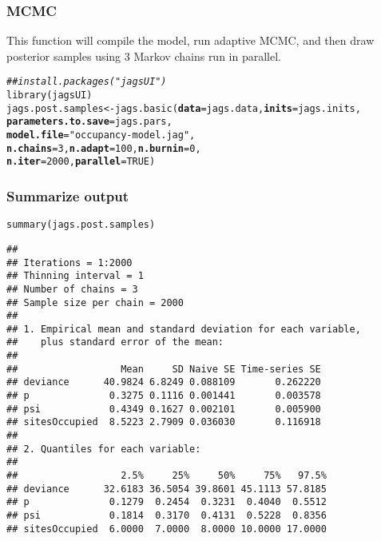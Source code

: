 \documentclass[color=usenames,dvipsnames]{beamer}\usepackage[]{graphicx}\usepackage[]{color}
\makeatletter
\newcommand{\hlnum}[1]{\textcolor[rgb]{0.69,0.494,0}{#1}}%
\newcommand{\hlstr}[1]{\textcolor[rgb]{0.749,0.012,0.012}{#1}}%
\newcommand{\hlcom}[1]{\textcolor[rgb]{0.514,0.506,0.514}{\textit{#1}}}%
\newcommand{\hlstd}[1]{\textcolor[rgb]{0,0,0}{#1}}%
\newcommand{\hlkwb}[1]{\textcolor[rgb]{0,0.341,0.682}{#1}}%
\newcommand{\hlkwc}[1]{\textcolor[rgb]{0,0,0}{\textbf{#1}}}%
\newcommand{\hlkwd}[1]{\textcolor[rgb]{0.004,0.004,0.506}{#1}}%
\newenvironment{kframe}{%
 \def\at@end@of@kframe{}%
 \ifinner\ifhmode%
  \def\at@end@of@kframe{\end{minipage}}%
  \begin{minipage}{\columnwidth}%
 \fi\fi%
 \def\FrameCommand##1{\hskip\@totalleftmargin \hskip-\fboxsep
 \colorbox{shadecolor}{##1}\hskip-\fboxsep
     \hskip-\linewidth \hskip-\@totalleftmargin \hskip\columnwidth}%
 \MakeFramed {\advance\hsize-\width
   \@totalleftmargin\z@ \linewidth\hsize
   \@setminipage}}%
 {\par\unskip\endMakeFramed%
 \at@end@of@kframe}
\newenvironment{knitrout}{}{} %
\makeatother
\begin{document}
\begin{frame}[fragile]
  \frametitle{MCMC}
  \small
  This function will compile the model, run adaptive MCMC, and then
  draw posterior samples using 3 Markov chains run in parallel. \\
\begin{knitrout}\scriptsize
{}\color{fgcolor}\begin{kframe}
\begin{alltt}
\hlcom{## install.packages("jagsUI")}
\hlkwd{library}\hlstd{(jagsUI)}
\hlstd{jags.post.samples} \hlkwb{<-} \hlkwd{jags.basic}\hlstd{(}\hlkwc{data}\hlstd{=jags.data,} \hlkwc{inits}\hlstd{=jags.inits,}
                                \hlkwc{parameters.to.save}\hlstd{=jags.pars,}
                                \hlkwc{model.file}\hlstd{=}\hlstr{"occupancy-model.jag"}\hlstd{,}
                                \hlkwc{n.chains}\hlstd{=}\hlnum{3}\hlstd{,} \hlkwc{n.adapt}\hlstd{=}\hlnum{100}\hlstd{,} \hlkwc{n.burnin}\hlstd{=}\hlnum{0}\hlstd{,}
                                \hlkwc{n.iter}\hlstd{=}\hlnum{2000}\hlstd{,} \hlkwc{parallel}\hlstd{=}\hlnum{TRUE}\hlstd{)}
\end{alltt}
\end{kframe}
\end{knitrout}
\end{frame}



\begin{frame}[fragile]
  \frametitle{Summarize output}
\begin{knitrout}\scriptsize
{}\color{fgcolor}\begin{kframe}
\begin{alltt}
\hlkwd{summary}\hlstd{(jags.post.samples)}
\end{alltt}
\begin{verbatim}
## 
## Iterations = 1:2000
## Thinning interval = 1 
## Number of chains = 3 
## Sample size per chain = 2000 
## 
## 1. Empirical mean and standard deviation for each variable,
##    plus standard error of the mean:
## 
##                  Mean     SD Naive SE Time-series SE
## deviance      40.9824 6.8249 0.088109       0.262220
## p              0.3275 0.1116 0.001441       0.003578
## psi            0.4349 0.1627 0.002101       0.005900
## sitesOccupied  8.5223 2.7909 0.036030       0.116918
## 
## 2. Quantiles for each variable:
## 
##                  2.5%     25%     50%     75%   97.5%
## deviance      32.6183 36.5054 39.8601 45.1113 57.8185
## p              0.1279  0.2454  0.3231  0.4040  0.5512
## psi            0.1814  0.3170  0.4131  0.5228  0.8356
## sitesOccupied  6.0000  7.0000  8.0000 10.0000 17.0000
\end{verbatim}
\end{kframe}
\end{knitrout}
\end{frame}
\end{document}
